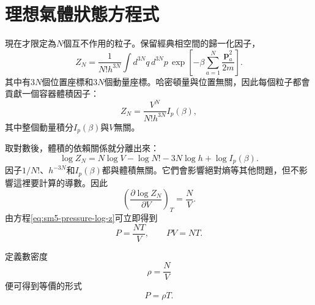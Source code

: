 \section{理想氣體狀態方程式}

現在才限定為\(N\)個互不作用的粒子。保留經典相空間的歸一化因子，
\begin{equation}
 Z_N=
 \frac{1}{N!h^{3N}}
 \int d^{3N}q\,d^{3N}p\,
 \exp\!\left[
 -\beta\sum_{a=1}^{N}\frac{\mathbf p_a^2}{2m}
 \right].
 \label{eq:sm5-ideal-gas-partition-integral}
\end{equation}
其中有\(3N\)個位置座標和\(3N\)個動量座標。哈密頓量與位置無關，因此每個粒子都會貢獻一個容器體積因子：
\begin{equation}
 Z_N=
 \frac{V^N}{N!h^{3N}}I_p(\beta),
 \label{eq:sm5-ideal-gas-factorization}
\end{equation}
其中整個動量積分\(I_p(\beta)\)與\(V\)無關。

\begin{classroomqa}
\end{classroomqa}

取對數後，體積的依賴關係就分離出來：
\begin{equation}
 \log Z_N
 =
 N\log V-\log N!-3N\log h+\log I_p(\beta).
 \label{eq:sm5-log-ideal-gas-partition}
\end{equation}
因子\(1/N!\)、\(h^{-3N}\)和\(I_p(\beta)\)都與體積無關。它們會影響絕對熵等其他問題，但不影響這裡要計算的導數。因此
\begin{equation}
 \left(\frac{\partial\log Z_N}{\partial V}\right)_T
 =\frac{N}{V}.
 \label{eq:sm5-log-z-volume-derivative}
\end{equation}
由方程\eqref{eq:sm5-pressure-log-z}可立即得到
\begin{equation}
 P=\frac{NT}{V},
 \qquad
 \boxed{PV=NT}.
 \label{eq:sm5-ideal-gas-law}
\end{equation}

\begin{classroomqa}
\end{classroomqa}

定義數密度
\begin{equation}
 \rho=\frac{N}{V}
 \label{eq:sm5-number-density}
\end{equation}
便可得到等價的形式
\begin{equation}
 P=\rho T.
 \label{eq:sm5-density-equation-of-state}
\end{equation}

